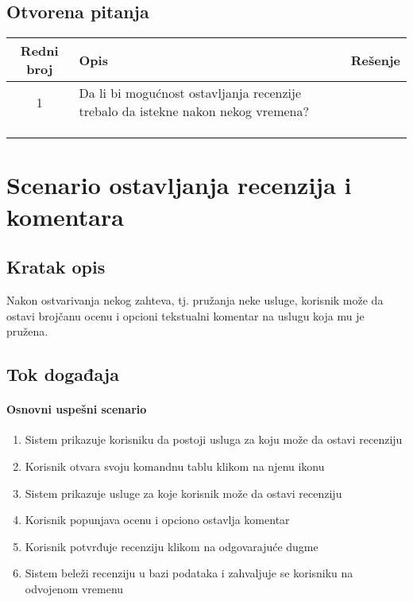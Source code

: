 \documentclass[a4paper,12pt]{report}
\newcommand{\genitivfunkcionalnosti}{ostavljanja recenzija i komentara}
\begin{document}
		\subsection{Otvorena pitanja}
			\begin{tabular}{ |c|p{10cm}|l| }
				\hline
				\textbf{Redni broj} & \textbf{Opis} & \textbf{Rešenje} \\ 
				\hline
			    1 & Da li bi mogućnost ostavljanja recenzije trebalo da istekne nakon nekog vremena? &  \\
				\hline
			    &  & \\
				\hline
				&  & \\
				\hline
				&  & \\
				\hline
			\end{tabular}
	\section{Scenario \genitivfunkcionalnosti}
		\subsection{Kratak opis}
			Nakon ostvarivanja nekog zahteva, tj. pružanja neke usluge, korisnik može da ostavi brojčanu ocenu i opcioni tekstualni komentar na uslugu koja mu je pružena.
		\newpage
		\subsection{Tok događaja}
			\paragraph*{Osnovni uspešni scenario}
				\begin{enumerate}
					\item Sistem prikazuje korisniku da postoji usluga za koju može da ostavi recenziju
					\item Korisnik otvara svoju komandnu tablu klikom na njenu ikonu
					\item Sistem prikazuje usluge za koje korisnik može da ostavi recenziju
					\item Korisnik popunjava ocenu i opciono ostavlja komentar
					\item Korisnik potvrđuje recenziju klikom na odgovarajuće dugme
					\item Sistem beleži recenziju u bazi podataka i zahvaljuje se korisniku na odvojenom vremenu
				\end{enumerate}
\end{document}
